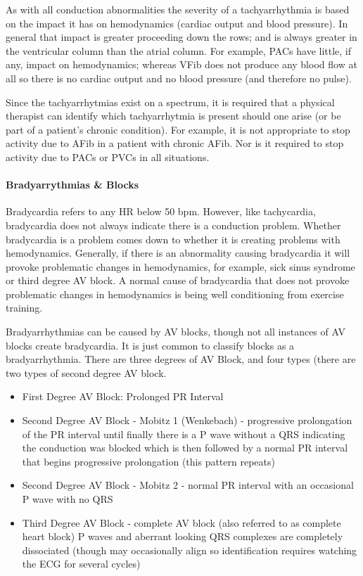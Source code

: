 As with all conduction abnormalities the severity of a tachyarrhythmia is based on the impact it has on hemodynamics (cardiac output and blood pressure). In general that impact is greater proceeding down the rows; and is always greater in the ventricular column than the atrial column. For example, PACs have little, if any, impact on hemodynamics; whereas VFib does not produce any blood flow at all so there is no cardiac output and no blood pressure (and therefore no pulse). 

Since the tachyarrhytmias exist on a spectrum, it is required that a physical therapist can identify which tachyarrhytmia is present should one arise (or be part of a patient's chronic condition). For example, it is not appropriate to stop activity due to AFib in a patient with chronic AFib. Nor is it required to stop activity due to PACs or PVCs in all situations. 


\paragraph{Bradyarrythmias \& Blocks}

Bradycardia refers to any HR below 50 bpm. However, like tachycardia, bradycardia does not always indicate there is a conduction problem. Whether bradycardia is a problem comes down to whether it is creating problems with hemodynamics. Generally, if there is an abnormality causing bradycardia it will provoke problematic changes in hemodynamics, for example, sick sinus syndrome or third degree AV block. A normal cause of bradycardia that does not provoke problematic changes in hemodynamics is being well conditioning from exercise training.

Bradyarrhythmias can be caused by AV blocks, though not all instances of AV blocks create bradycardia. It is just common to classify blocks as a bradyarrhythmia. There are three degrees of AV Block, and four types (there are two types of second degree AV block.

\begin{itemize}
    \item First Degree AV Block: Prolonged PR Interval
    \item Second Degree AV Block - Mobitz 1 (Wenkebach) - progressive prolongation of the PR interval until finally there is a P wave without a QRS indicating the conduction was blocked which is then followed by a normal PR interval that begins progressive prolongation (this pattern repeats)
    \item Second Degree AV Block - Mobitz 2 - normal PR interval with an occasional P wave with no QRS
    \item Third Degree AV Block - complete AV block (also referred to as complete heart block) P waves and aberrant looking QRS complexes are completely dissociated (though may occasionally align so identification requires watching the ECG for several cycles)
\end{itemize}

